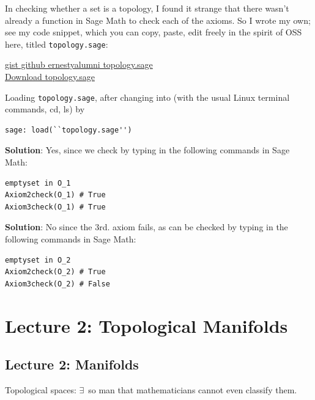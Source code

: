 In checking whether a set is a topology, I found it strange that there wasn't already a function in Sage Math to check each of the axioms.  So I wrote my own; see my code snippet, which you can copy, paste, edit freely in the spirit of OSS here, titled \texttt{topology.sage}: 

\href{https://gist.github.com/ernestyalumni/903eefd01be1f214598b}{gist github ernestyalumni topology.sage} \\
\href{https://gist.githubusercontent.com/ernestyalumni/903eefd01be1f214598b/raw/67083e3b3dec2faf2087713236b413b741bd1180/topology.sage}{Download topology.sage}

Loading \texttt{topology.sage}, after changing into (with the usual Linux terminal commands, cd, ls) by 
\begin{lstlisting}[frame=single]
sage: load(``topology.sage'')
\end{lstlisting}



\textbf{Solution}: Yes, since we check by typing in the following commands in Sage Math:

\begin{lstlisting}[frame=single]
emptyset in O_1
Axiom2check(O_1) # True
Axiom3check(O_1) # True
\end{lstlisting}


\textbf{Solution}: No since the 3rd. axiom fails, as can be checked by typing in the following commands in Sage Math:
\begin{lstlisting}[frame=single]
emptyset in O_2
Axiom2check(O_2) # True
Axiom3check(O_2) # False
\end{lstlisting}

\section{Lecture 2: Topological Manifolds}

\subsection*{Lecture 2: Manifolds}

Topological spaces: $\exists \,$ so man that mathematicians cannot even classify them. 

